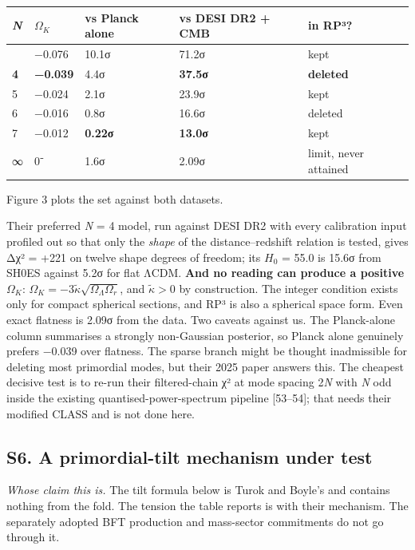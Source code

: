 \documentclass[
]{article}
\newcounter{none} %
\begin{document}
{\def\LTcaptype{none} %
\begin{longtable}[]{@{}lllll@{}}
\toprule\noalign{}
\emph{N} & \(\Omega_K\) & vs Planck alone & vs DESI DR2 + CMB & in
RP³? \\
\midrule\noalign{}
\endhead
\bottomrule\noalign{}
\endlastfoot
3 & −0.076 & 10.1σ & 71.2σ & kept \\
\textbf{4} & \textbf{−0.039} & 4.4σ & \textbf{37.5σ} &
\textbf{deleted} \\
5 & −0.024 & 2.1σ & 23.9σ & kept \\
6 & −0.016 & 0.8σ & 16.6σ & deleted \\
7 & −0.012 & \textbf{0.22σ} & \textbf{13.0σ} & kept \\
∞ & 0⁻ & 1.6σ & 2.09σ & limit, never attained \\
\end{longtable}
}

Figure 3 plots the set against both datasets.

Their preferred \emph{N} = 4 model, run against DESI DR2 with every
calibration input profiled out so that only the \emph{shape} of the
distance--redshift relation is tested, gives Δχ² = +221 on twelve shape
degrees of freedom; its \(H_0\) = 55.0 is 15.6σ from SH0ES against 5.2σ
for flat ΛCDM. \textbf{And no reading can produce a positive
\(\Omega_K\)}:
\(\Omega_K=-3\widetilde\kappa\sqrt{\Omega_\Lambda\Omega_r}\), and
\(\widetilde\kappa>0\) by construction. The integer condition exists
only for compact spherical sections, and RP³ is also a spherical space
form. Even exact flatness is 2.09σ from the data. Two caveats against
us. The Planck-alone column summarises a strongly non-Gaussian
posterior, so Planck alone genuinely prefers −0.039 over flatness. The
sparse branch might be thought inadmissible for deleting most primordial
modes, but their 2025 paper answers this. The cheapest decisive test is
to re-run their filtered-chain χ² at mode spacing 2\emph{N} with
\emph{N} odd inside the existing quantised-power-spectrum pipeline
{[}53--54{]}; that needs their modified CLASS and is not done here.

\subsection{S6. A primordial-tilt mechanism under
test}\label{s6.-a-primordial-tilt-mechanism-under-test}

\emph{Whose claim this is.} The tilt formula below is Turok and Boyle's
and contains nothing from the fold. The tension the table reports is
with their mechanism. The separately adopted BFT production and
mass-sector commitments do not go through it.
\end{document}
